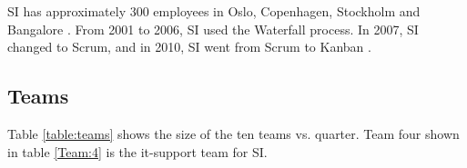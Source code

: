 \documentclass[UKenglish]{ifimaster}  %
\begin{document}
SI has approximately 300 employees in Oslo, Copenhagen, Stockholm and Bangalore \parencite{SI}. From 2001 to 2006, SI used the Waterfall process. In 2007, SI changed to Scrum, and in 2010, SI went from Scrum to Kanban \parencite{Dag}.

\subsection{Teams}
Table \ref{table:teams} shows the size of the ten teams vs. quarter. Team four shown in table \ref{Team:4} is the it-support team for SI. 
\begin{table}[!htbp]
  \begin{adjustwidth}{-0cm}{}
\end{adjustwidth}
\end{table}
\end{document}
